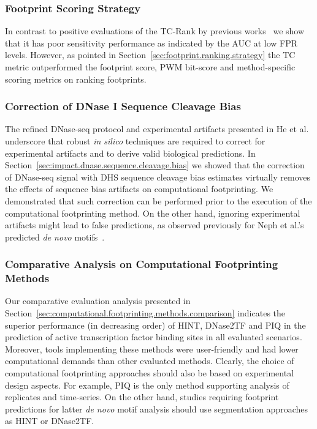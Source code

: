 \subsubsection{Footprint Scoring Strategy}

In contrast to positive evaluations of the TC-Rank by previous works~\cite{cuellar2012,he2014} we show that it has poor sensitivity performance as indicated by the AUC at low FPR levels. However, as pointed in Section~\ref{sec:footprint.ranking.strategy} the TC metric outperformed the footprint score, PWM bit-score and method-specific scoring metrics on ranking footprints.

\subsubsection{Correction of DNase I Sequence Cleavage Bias}

The refined DNase-seq protocol and experimental artifacts presented in He et al.~\cite{he2014} underscore that robust \emph{in silico} techniques are required to correct for experimental artifacts and to derive valid biological predictions. In Section~\ref{sec:impact.dnase.sequence.cleavage.bias} we showed that the correction of DNase-seq signal with DHS sequence cleavage bias estimates virtually removes the effects of sequence bias artifacts on computational footprinting. We demonstrated that such correction can be performed prior to the execution of the computational footprinting method. On the other hand, ignoring experimental artifacts might lead to false predictions, as observed previously for Neph et al.'s predicted \emph{de novo} motifs~\cite{neph2012a,he2014}. 

\subsubsection{Comparative Analysis on Computational Footprinting Methods}

Our comparative evaluation analysis presented in Section~\ref{sec:computational.footprinting.methods.comparison} indicates the superior performance (in decreasing order) of HINT, DNase2TF and PIQ in the prediction of active transcription factor binding sites in all evaluated scenarios. Moreover, tools implementing these methods were user-friendly and had lower computational demands than other evaluated methods. Clearly, the choice of computational footprinting approaches should also be based on experimental design aspects. For example, PIQ is the only method supporting analysis of replicates and time-series. On the other hand, studies requiring footprint predictions for latter \emph{de novo} motif analysis should use segmentation approaches as HINT or DNase2TF.

